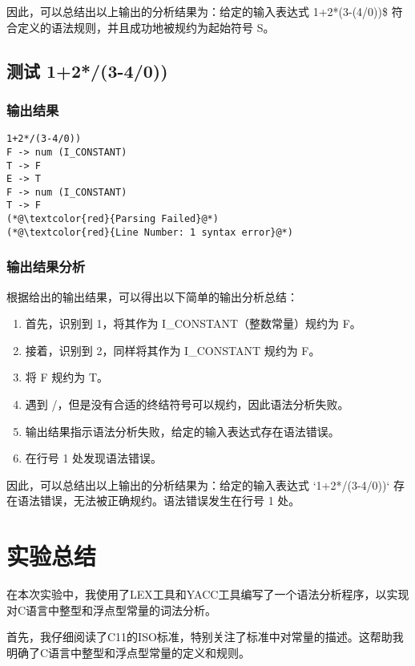 \documentclass[lang=cn,11pt,a4paper]{elegantpaper}
\begin{document}
因此，可以总结出以上输出的分析结果为：给定的输入表达式 1+2*(3-(4/0))\$ 符合定义的语法规则，并且成功地被规约为起始符号 S。

\subsection{测试 1+2*/(3-4/0))}

\subsubsection{输出结果}

\begin{lstlisting}[language=text]
1+2*/(3-4/0))
F -> num (I_CONSTANT)
T -> F
E -> T
F -> num (I_CONSTANT)
T -> F
(*@\textcolor{red}{Parsing Failed}@*) 
(*@\textcolor{red}{Line Number: 1 syntax error}@*)
\end{lstlisting}

\subsubsection{输出结果分析}

根据给出的输出结果，可以得出以下简单的输出分析总结：
\begin{enumerate}
    \item 首先，识别到 1，将其作为 I\_CONSTANT（整数常量）规约为 F。
    \item 接着，识别到 2，同样将其作为 I\_CONSTANT 规约为 F。
    \item 将 F 规约为 T。
    \item 遇到 /，但是没有合适的终结符号可以规约，因此语法分析失败。
    \item 输出结果指示语法分析失败，给定的输入表达式存在语法错误。
    \item 在行号 1 处发现语法错误。
\end{enumerate}


因此，可以总结出以上输出的分析结果为：给定的输入表达式 `1+2*/(3-4/0))` 存在语法错误，无法被正确规约。语法错误发生在行号 1 处。


\section{实验总结}

在本次实验中，我使用了LEX工具和YACC工具编写了一个语法分析程序，以实现对C语言中整型和浮点型常量的词法分析。

首先，我仔细阅读了C11的ISO标准，特别关注了标准中对常量的描述。这帮助我明确了C语言中整型和浮点型常量的定义和规则。
\end{document}
